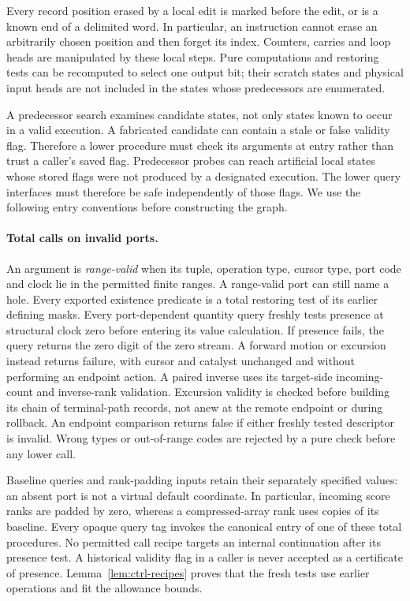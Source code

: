 Every record position erased by a local edit is marked before the edit,
or is a known end of a delimited word.  In particular, an instruction
cannot erase an arbitrarily chosen position and then forget its index.
Counters, carries and loop heads are manipulated by these local steps.
Pure computations and restoring tests can be recomputed to select one
output bit; their scratch states and physical input heads are not
included in the states whose predecessors are enumerated.

A predecessor search examines candidate states, not only states known to occur in a valid execution. A fabricated candidate can contain a stale or false validity flag. Therefore a lower procedure must check its arguments at entry rather than trust a caller's saved flag. Predecessor probes can reach artificial local states whose stored flags were not produced by a designated execution.  The lower query interfaces
must therefore be safe independently of those flags.  We use the
following entry conventions before constructing the graph.

\paragraph{Total calls on invalid ports.}
An argument is \emph{range-valid} when its tuple, operation type,
cursor type, port code and clock lie in the permitted finite ranges.
A range-valid port can still name a hole. Every exported existence
predicate is a total restoring test of its earlier defining masks.
Every port-dependent quantity query freshly tests presence at structural
clock zero before entering its value calculation. If presence fails,
the query returns the zero digit of the zero stream. A forward motion
or excursion instead returns failure, with cursor and catalyst unchanged
and without performing an endpoint action. A paired inverse uses its
target-side incoming-count and inverse-rank validation. Excursion
validity is checked before building its chain of terminal-path records, not anew at the
remote endpoint or during rollback. An endpoint comparison returns
false if either freshly tested descriptor is invalid. Wrong types or
out-of-range codes are rejected by a pure check before any lower call.

Baseline queries and rank-padding inputs retain their separately
specified values: an absent port is not a virtual default coordinate.
In particular, incoming score ranks are padded by zero, whereas a
compressed-array rank uses copies of its baseline. Every opaque query
tag invokes the canonical entry of one of these total procedures.
No permitted call recipe targets an internal continuation after its
presence test. A historical validity flag in a caller is never accepted
as a certificate of presence. Lemma~\ref{lem:ctrl-recipes} proves that
the fresh tests use earlier operations and fit the allowance bounds.

